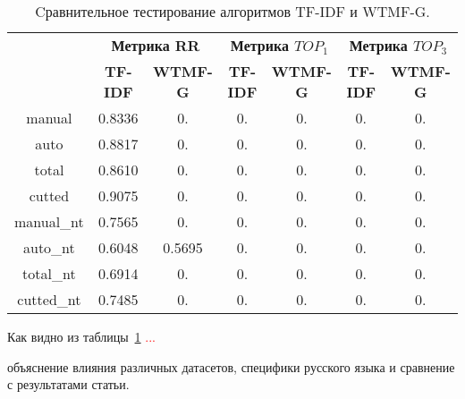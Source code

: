     \begin{table}[ht!]
    \caption{Cравнительное тестирование алгоритмов TF-IDF и WTMF-G. \bigskip}
    \centering

    \label{tabular:tfidf_wmtfg}
        \begin{tabular}{|c|c|c|c|c|c|c|}
            \hline
            \bf{\multirow{2}{*}{\specialcell{Набор данных}}} &
            \multicolumn{2}{|c|}{\bf{Метрика RR}} &
            \multicolumn{2}{|c|}{\bf{Метрика $TOP_1$}} &
            \multicolumn{2}{|c|}{\bf{Метрика $TOP_3$}} \\ \cline{2-7}
            & \bf{TF-IDF} & \bf{WTMF-G} & \bf{TF-IDF} & \bf{WTMF-G} & \bf{TF-IDF} & \bf{WTMF-G} \\ \hline
            manual & 0.8336 & 0. & 0. & 0. & 0. & 0. \\ \hline
            auto & 0.8817 & 0. & 0. & 0. & 0. & 0. \\ \hline
            total & 0.8610 & 0. & 0. & 0. & 0. & 0. \\ \hline
            cutted & 0.9075 & 0. & 0. & 0. & 0. & 0. \\ \hline
            manual\_nt & 0.7565 & 0. & 0. & 0. & 0. & 0. \\ \hline
            auto\_nt & 0.6048 & 0.5695 & 0. & 0. & 0. & 0. \\ \hline
            total\_nt & 0.6914 & 0. & 0. & 0. & 0. & 0. \\ \hline
            cutted\_nt & 0.7485 & 0. & 0. & 0. & 0. & 0. \\ \hline
        \end{tabular}
    \end{table}
    Как видно из таблицы~\ref{tabular:tfidf_wmtfg} \textcolor{red}{...}

    объяснение влияния различных датасетов, специфики русского языка и сравнение с результатами статьи.

